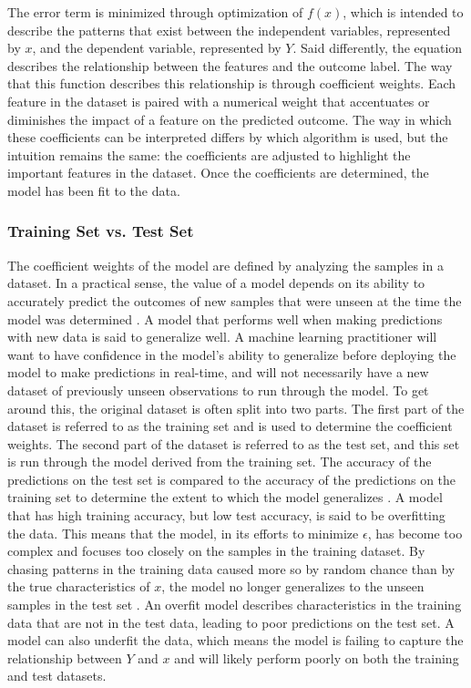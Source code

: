 \documentclass[sigconf]{acmart}
\begin{document}
The error term is minimized through optimization of \(f(x)\), which is intended to describe the patterns that exist between the independent variables, represented by \(x\), and the dependent variable, represented by \(Y\). Said differently, the equation describes the relationship between the features and the outcome label. The way that this function describes this relationship is through coefficient weights. Each feature in the dataset is paired with a numerical weight that accentuates or diminishes the impact of a feature on the predicted outcome. The way in which these coefficients can be interpreted differs by which algorithm is used, but the intuition remains the same: the coefficients are adjusted to highlight the important features in the dataset. Once the coefficients are determined, the model has been fit to the data.

\subsubsection{Training Set vs. Test Set}

The coefficient weights of the model are defined by analyzing the samples in a dataset. In a practical sense, the value of a model depends on its ability to accurately predict the outcomes of new samples that were unseen at the time the model was determined \cite{cite08}. A model that performs well when making predictions with new data is said to generalize well.
A machine learning practitioner will want to have confidence in the model's ability to generalize before deploying the model to make predictions in real-time, and will not necessarily have a new dataset of previously unseen observations to run through the model. To get around this, the original dataset is often split into two parts. The first part of the dataset is referred to as the training set and is used to determine the coefficient weights. The second part of the dataset is referred to as the test set, and this set is run through the model derived from the training set. The accuracy of the predictions on the test set is compared to the accuracy of the predictions on the training set to determine the extent to which the model generalizes \cite{cite08}.
A model that has high training accuracy, but low test accuracy, is said to be overfitting the data. This means that the model, in its efforts to minimize \(\epsilon\), has become too complex and focuses too closely on the samples in the training dataset. By chasing patterns in the training data caused more so by random chance than by the true characteristics of \(x\), the model no longer generalizes to the unseen samples in the test set \cite{cite03}\cite{cite08}. An overfit model describes characteristics in the training data that are not in the test data, leading to poor predictions on the test set.
A model can also underfit the data, which means the model is failing to capture the relationship between \(Y\) and \(x\) and will likely perform poorly on both the training and test datasets.
\end{document}
